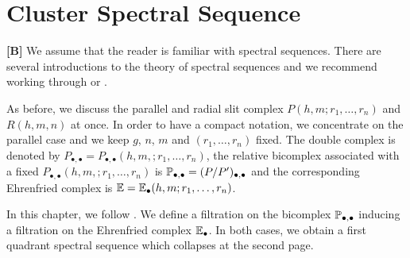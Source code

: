 \chapter{Cluster Spectral Sequence}
\label{chapter_css}
{\bf [B]}
We assume that the reader is familiar with spectral sequences.
There are several introductions to the theory of spectral sequences and we recommend working through \cite[Chapter 5]{Weibel1995} or \cite[Chapter 9]{Spanier199412}.

As before, we discuss the parallel and radial slit complex $P(h,m;r_1, \ldots, r_n)$ and $R(h,m,n)$ at once.
In order to have a compact notation, we concentrate on the parallel case and
we keep $g$, $n$, $m$ and $(r_1, \ldots, r_n)$ fixed.
\label{page:PP}%
The double complex is denoted by $P_{\bullet,\bullet} = P_{\bullet,\bullet}(h,m,; r_1, \ldots, r_n)$,
the relative bicomplex associated with a fixed $P_{\bullet,\bullet}(h,m,; r_1, \ldots, r_n)$ is $\mathbb P_{\bullet, \bullet} = (P / P')_{\bullet, \bullet}$
and the corresponding Ehrenfried complex is $\E = \E_\bullet(h,m; r_1, \ldots, r_n)$.

In this chapter, we follow \cite{Boedigheimer201314}.
We define a filtration on the bicomplex $\mathbb P_{\bullet, \bullet}$ inducing a filtration on the Ehrenfried complex $\mathbb E_\bullet$.
In both cases, we obtain a first quadrant spectral sequence which collapses at the second page.

